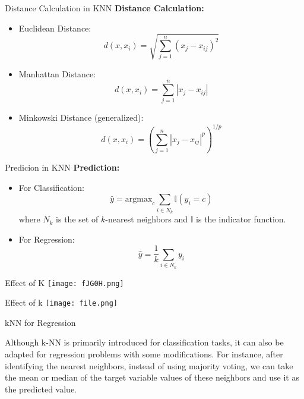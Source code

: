 \documentclass[serif, aspectratio=169]{beamer}
\begin{document}
\begin{frame}{Distance Calculation in KNN}
    \textbf{Distance Calculation:}
    \begin{itemize}
        \item Euclidean Distance:
        \[
        d(x, x_i) = \sqrt{\sum_{j=1}^n (x_j - x_{ij})^2}
        \]
        \item Manhattan Distance:
        \[
        d(x, x_i) = \sum_{j=1}^n |x_j - x_{ij}|
        \]
        \item Minkowski Distance (generalized):
        \[
        d(x, x_i) = \left( \sum_{j=1}^n |x_j - x_{ij}|^p \right)^{1/p}
        \]
    \end{itemize}
\end{frame}

\begin{frame}{Predicion in KNN}
    \textbf{Prediction:}
    \begin{itemize}
        \item For Classification:
        \[
        \hat{y} = \text{argmax}_c \sum_{i \in N_k} \mathbb{I}(y_i = c)
        \]
        where \( N_k \) is the set of \( k \)-nearest neighbors and \( \mathbb{I} \) is the indicator function.
        \item For Regression:
        \[
        \hat{y} = \frac{1}{k} \sum_{i \in N_k} y_i
        \]
    \end{itemize}
\end{frame}

\begin{frame}{Effect of K}
    \hspace*{\fill}
    \texttt{[image: fJG0H.png]}
    \hspace*{\fill}
\end{frame}

\begin{frame}{Effect of k}
    \hspace*{\fill}
    \texttt{[image: file.png]}
    \hspace*{\fill}
\end{frame}

\begin{frame}{kNN for Regression}

    \item Although k-NN is primarily introduced for classification tasks, it can also be adapted for regression problems with some modifications. For instance, after identifying the nearest neighbors, instead of using majority voting, we can take the mean or median of the target variable values of these neighbors and use it as the predicted value.
    
\end{frame}
\end{document}
